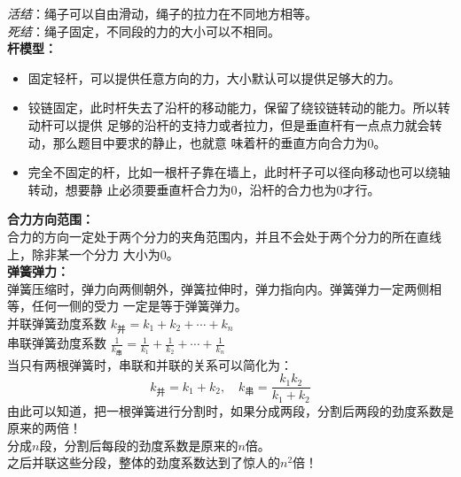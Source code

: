 \documentclass[a4paper, landscape, 10pt, twocolumn]{article}
\begin{document}
\emph{活结}：绳子可以自由滑动，绳子的拉力在不同地方相等。\\
\emph{死结}：绳子固定，不同段的力的大小可以不相同。\\
\textbf{杆模型：}
\begin{itemize}
  \item 固定轻杆，可以提供任意方向的力，大小默认可以提供足够大的力。
  \item 铰链固定，此时杆失去了沿杆的移动能力，保留了绕铰链转动的能力。所以转动杆可以提供
    足够的沿杆的支持力或者拉力，但是垂直杆有一点点力就会转动，那么题目中要求的静止，也就意
    味着杆的垂直方向合力为0。
  \item 完全不固定的杆，比如一根杆子靠在墙上，此时杆子可以径向移动也可以绕轴转动，想要静
    止必须要垂直杆合力为0，沿杆的合力也为0才行。
\end{itemize}
\textbf{合力方向范围：}\\
合力的方向一定处于两个分力的夹角范围内，并且不会处于两个分力的所在直线上，除非某一个分力
大小为0。\\
\textbf{弹簧弹力：}\\
弹簧压缩时，弹力向两侧朝外，弹簧拉伸时，弹力指向内。弹簧弹力一定两侧相等，任何一侧的受力
一定是等于弹簧弹力。\\
并联弹簧劲度系数 $k_\text{并} = k_1 + k_2 + \cdots + k_n$\\
串联弹簧劲度系数 $\frac1{k_\text{串}} = \frac{1}{k_1} + \frac{1}{k_2} +
\cdots + \frac{1}{k_n}$\\
当只有两根弹簧时，串联和并联的关系可以简化为：
\[
  k_\text{并} = k_1 + k_2, \quad k_\text{串} = \frac{k_1 k_2}{k_1 + k_2}
\]
由此可以知道，把一根弹簧进行分割时，如果分成两段，分割后两段的劲度系数是原来的两倍！\\
分成$n$段，分割后每段的劲度系数是原来的$n$倍。\\
之后并联这些分段，整体的劲度系数达到了惊人的$n^2$倍！\\
\end{document}
